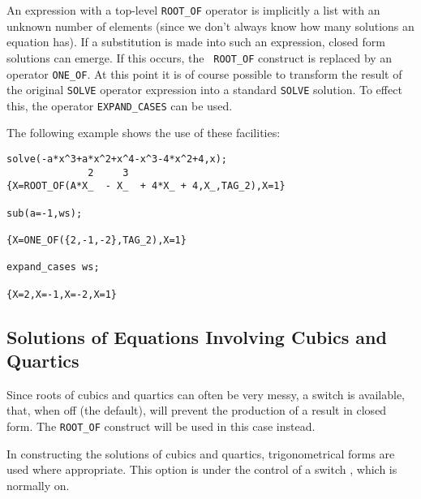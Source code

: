 \hypertarget{operator:ONE_OF}{}
\hypertarget{operator:EXPAND_CASES}{}
An expression with a top-level \texttt{ROOT\_OF} operator is implicitly a
list with an unknown number of elements (since we don't always know how
many solutions an equation has).  If a substitution is made into such an
expression, closed form solutions can emerge.  If this occurs, the {\tt
ROOT\_OF} construct is replaced by an operator \texttt{ONE\_OF}.
At this point it is of course possible to transform the result of the
original \texttt{SOLVE} operator expression into a standard \texttt{SOLVE}
solution.  To effect this, the operator \texttt{EXPAND\_CASES}
 can be used.

The following example shows the use of these facilities:
\begin{verbatim}
solve(-a*x^3+a*x^2+x^4-x^3-4*x^2+4,x);
              2     3
{X=ROOT_OF(A*X_  - X_  + 4*X_ + 4,X_,TAG_2),X=1}

sub(a=-1,ws);

{X=ONE_OF({2,-1,-2},TAG_2),X=1}

expand_cases ws;

{X=2,X=-1,X=-2,X=1}
\end{verbatim}

\subsection{Solutions of Equations Involving Cubics and Quartics}
\hypertarget{switch:FULLROOTS}{}
\hypertarget{switch:TRIGFORM}{}

Since roots of cubics and quartics can often be very messy, a switch
 is available, that, when off (the
default), will prevent the production of a result in closed form.  The
\texttt{ROOT\_OF} construct will be used in this case instead.

In constructing the solutions of cubics and quartics, trigonometrical
forms are used where appropriate.  This option is under the control of a
switch , which is normally on.

